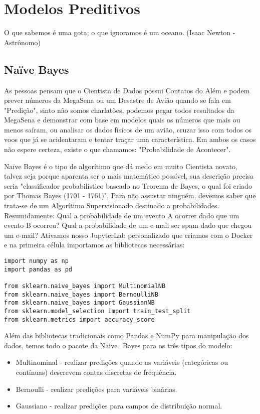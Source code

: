 \chapter{Modelos Preditivos}

\begin{remark}
O que sabemos é uma gota; o que ignoramos é um oceano. (Isaac Newton - Astrônomo) 
\end{remark}

\section{Naïve Bayes}
As pessoas pensam que o Cientista de Dados possui Contatos do Além e podem prever números da MegaSena ou um Desastre de Avião quando se fala em "Predição", sinto não somos charlatões, podemos pegar todos resultados da MegaSena e demonstrar com base em modelos quais os números que mais ou menos saíram, ou analisar os dados físicos de um avião, cruzar isso com todos os voos que já se acidentaram e tentar traçar uma característica. Em ambos os casos não espere certeza, existe o que chamamos: "Probabilidade de Acontecer".

Naïve Bayes é o tipo de algorítimo que dá medo em muito Cientista novato, talvez seja porque aparenta ser o mais matemático possível, sua descrição precisa seria "classificador probabilístico baseado no Teorema de Bayes, o qual foi criado por Thomas Bayes (1701 - 1761)". Para não assustar ninguém, devemos saber que trata-se de um Algorítimo Supervisionado destinado a probabilidades. Resumidamente: Qual a probabilidade de um evento A ocorrer dado que um evento B ocorreu? Qual a probabilidade de um e-mail ser spam dado que chegou um e-mail? Ativamos nosso JupyterLab personalizado que criamos com o Docker e na primeira célula importamos as bibliotecas necessárias:
\begin{lstlisting}[]
import numpy as np
import pandas as pd

from sklearn.naive_bayes import MultinomialNB
from sklearn.naive_bayes import BernoulliNB
from sklearn.naive_bayes import GaussianNB
from sklearn.model_selection import train_test_split
from sklearn.metrics import accuracy_score
\end{lstlisting}

Além das bibliotecas tradicionais como Pandas e NumPy para manipulação dos dados, temos todo o pacote da Naive\_Bayes para os três tipos do modelo:
\begin{itemize}[nolistsep]
	\item Multinominal - realizar predições quando as variáveis (categóricas ou contínuas) descrevem contas discretas de frequência.
	\item Bernoulli - realizar predições para variáveis binárias.
	\item Gaussiano - realizar predições para campos de distribuição normal.
\end{itemize}
	
